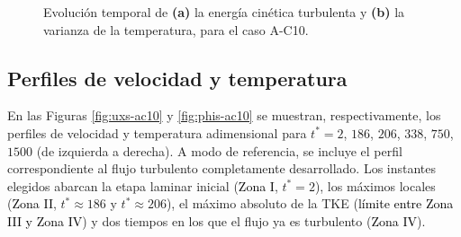 \newpage

\begin{figure}[H]
  \centering  
    
  \caption{Evolución temporal de \textbf{(a)} la energía cinética turbulenta y \textbf{(b)} la varianza de la temperatura, para el caso A-C10.}
  \label{fig:ac10-2}
\end{figure}

\subsection{Perfiles de velocidad y temperatura}

En las Figuras \ref{fig:uxs-ac10} y \ref{fig:phis-ac10} se muestran, respectivamente, los perfiles de velocidad y \linebreak temperatura adimensional para $t^*=2$, $186$, $206$, $338$, $750$, $1500$ (de izquierda a derecha). A modo de referencia, se incluye el perfil correspondiente al flujo turbulento completamente \linebreak desarrollado. Los instantes elegidos abarcan la etapa laminar inicial (\textcolor{black}{Zona I}, $t^*=2$), los máximos locales (\textcolor{black}{Zona II}, $t^* \approx 186$ y $t^* \approx 206$), el máximo absoluto de la TKE (\textcolor{black}{límite entre Zona III y Zona IV}) y dos tiempos en los que el flujo ya es turbulento (\textcolor{black}{Zona IV}).

